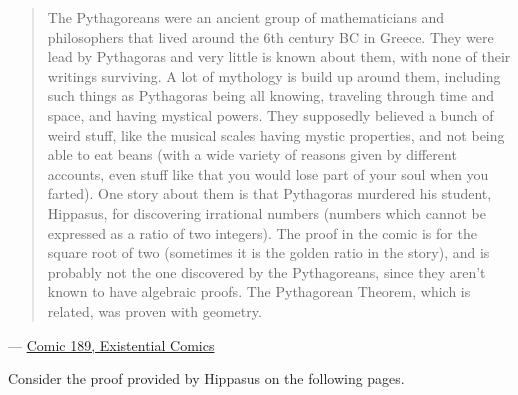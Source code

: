 \documentclass[addpoints]{exam}
\theoremstyle{definition}
\theoremstyle{claim}
\begin{document}
\begin{questions}
  \question [10]

  \begin{quotation}
The Pythagoreans were an ancient group of mathematicians and philosophers that lived around the 6th century BC in Greece. They were lead by Pythagoras and very little is known about them, with none of their writings surviving. A lot of mythology is build up around them, including such things as Pythagoras being all knowing, traveling through time and space, and having mystical powers. They supposedly believed a bunch of weird stuff, like the musical scales having mystic properties, and not being able to eat beans (with a wide variety of reasons given by different accounts, even stuff like that you would lose part of your soul when you farted). One story about them is that Pythagoras murdered his student, Hippasus, for discovering irrational numbers (numbers which cannot be expressed as a ratio of two integers). The proof in the comic is for the square root of two (sometimes it is the golden ratio in the story), and is probably not the one discovered by the Pythagoreans, since they aren't known to have algebraic proofs. The Pythagorean Theorem, which is related, was proven with geometry.    
  \end{quotation}
  \hfill --- \href{https://existentialcomics.com/comic/189}{Comic 189, Existential Comics}
  
  Consider the proof provided by Hippasus on the following pages.
  
  \begin{solution}
  \end{solution}


\end{questions}
\end{document}
